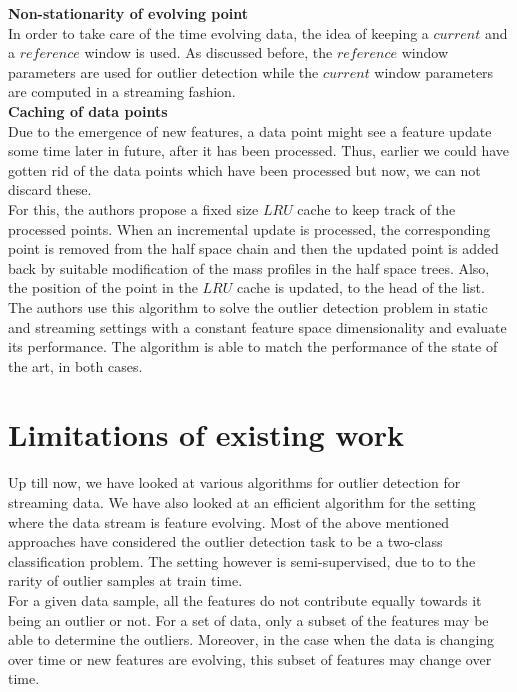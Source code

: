 \noindent \textbf{Non-stationarity of evolving point} \\

In order to take care of the time evolving data, the idea of keeping a $current$ and a $reference$ window is used. As discussed before, the $reference$ window parameters are used for outlier detection while the $current$ window parameters are computed in a streaming fashion. \\

\noindent \textbf{Caching of data points} \\

Due to the emergence of new features, a data point might see a feature update some time later in future, after it has been processed. Thus, earlier we could have gotten rid of the data points which have been processed but now, we can not discard these. \\

For this, the authors propose a fixed size $LRU$ cache to keep track of the processed points. When an incremental update is processed, the corresponding point is removed from the half space chain and then the updated point is added back by suitable modification of the mass profiles in the half space trees. Also, the position of the point in the $LRU$ cache is updated, to the head of the list. \\

The authors use this algorithm to solve the outlier detection problem in static and streaming settings with a constant feature space dimensionality and evaluate its performance. The algorithm is able to match the performance of the state of the art, in both cases.

\section{Limitations of existing work}

Up till now, we have looked at various algorithms for outlier detection for streaming data. We have also looked at an efficient algorithm for the setting where the data stream is feature evolving. Most of the above mentioned approaches have considered the outlier detection task to be a two-class classification problem. The setting however is semi-supervised, due to to the rarity of outlier samples at train time. \\

For a given data sample, all the features do not contribute equally towards it being an outlier or not. For a set of data, only a subset of the features may be able to determine the outliers. Moreover, in the case when the data is changing over time or new features are evolving, this subset of features may change over time. \\

